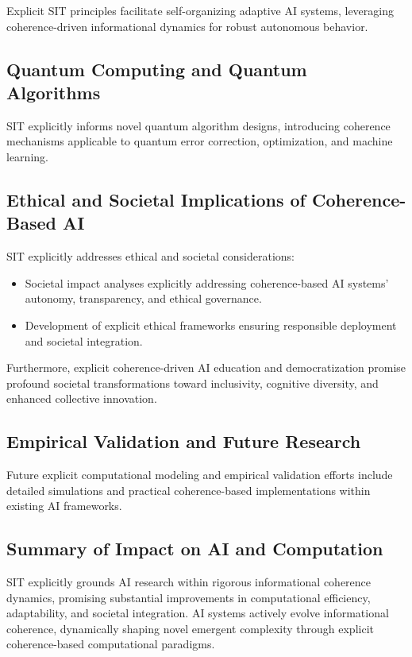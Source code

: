 \documentclass[american,11pt,letterpaper]{article}
\begin{document}
Explicit SIT principles facilitate self-organizing adaptive AI systems, leveraging coherence-driven informational dynamics for robust autonomous behavior.

\subsection{Quantum Computing and Quantum Algorithms}

SIT explicitly informs novel quantum algorithm designs, introducing coherence mechanisms applicable to quantum error correction, optimization, and machine learning.

\subsection{Ethical and Societal Implications of Coherence-Based AI}

SIT explicitly addresses ethical and societal considerations:

\begin{itemize}
\item Societal impact analyses explicitly addressing coherence-based AI systems' autonomy, transparency, and ethical governance.
\item Development of explicit ethical frameworks ensuring responsible deployment and societal integration.
\end{itemize}

Furthermore, explicit coherence-driven AI education and democratization promise profound societal transformations toward inclusivity, cognitive diversity, and enhanced collective innovation.

\subsection{Empirical Validation and Future Research}

Future explicit computational modeling and empirical validation efforts include detailed simulations and practical coherence-based implementations within existing AI frameworks.

\subsection{Summary of Impact on AI and Computation}

SIT explicitly grounds AI research within rigorous informational coherence dynamics, promising substantial improvements in computational efficiency, adaptability, and societal integration. AI systems actively evolve informational coherence, dynamically shaping novel emergent complexity through explicit coherence-based computational paradigms.
\end{document}
